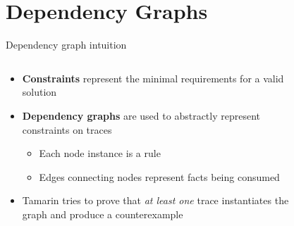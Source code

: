 \documentclass[11pt,aspectratio=169]{beamer}
\begin{document}

\section{Dependency Graphs}


\begin{frame}[fragile]{Dependency graph intuition}
    \begin{columns}
        \begin{column}{.6\textwidth}
            \begin{itemize}
                \item \textbf{Constraints} represent the minimal requirements 
                      for a valid solution
                \item \textbf{Dependency graphs} are used to abstractly 
                      represent constraints on traces
                \begin{itemize}
                    \item Each node instance is a rule
                    \item Edges connecting nodes represent facts being consumed
                \end{itemize}
                \item Tamarin tries to prove that \textit{at least one} trace 
                      instantiates the graph and produce a counterexample
            \end{itemize}
        \end{column}
        \begin{column}{.4\textwidth}
            \begin{figure}

\end{figure}
\end{column}
\end{columns}
\end{frame}
\end{document}
